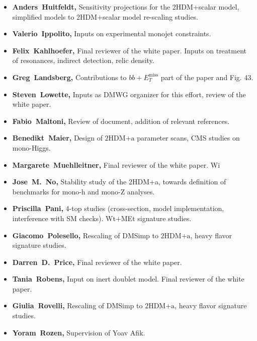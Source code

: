 \documentclass[a4paper, 11pt,notoc]{article}
\newcommand{\MET}{\ensuremath{E_T^\mathrm{miss}}\xspace}
\newcommand{\hdma}{\ensuremath{\textrm{2HDM+a}}\xspace}
\begin{document}
\begin{itemize}
\item \textbf{Anders~Huitfeldt,} Sensitivity projections for the 2HDM+scalar model, simplified models to 2HDM+scalar model re-scaling studies. 

\item \textbf{Valerio~Ippolito,} Inputs on experimental monojet constraints. 

\item \textbf{Felix~Kahlhoefer,} Final reviewer of the white paper. Inputs on treatment of resonances, indirect detection, relic density. 

\item \textbf{Greg~Landsberg,} Contributions to $bb+\MET$ part of the paper and Fig. 43.

\item \textbf{Steven~Lowette,} Inputs as DMWG organizer for this effort, review of the white paper. 

\item \textbf{Fabio~Maltoni,} Review of document, addition of relevant references.

\item \textbf{Benedikt~Maier,} Design of \hdma parameter scans, CMS studies on mono-Higgs.

\item \textbf{Margarete~Muehlleitner,} Final reviewer of the white paper. Wi

\item \textbf{Jose~M.~No,} Stability study of the 2HDM+a, towards definition of benchmarks for mono-h and mono-Z analyses.

\item \textbf{Priscilla~Pani,} 4-top studies (cross-section, model implementation, interference with SM checks). Wt+MEt signature studies. 

\item \textbf{Giacomo~Polesello,} Rescaling of DMSimp to \hdma, heavy flavor signature studies. 

\item \textbf{Darren~D.~Price,}  Final reviewer of the white paper. 

\item \textbf{Tania~Robens,} Input on inert doublet model. Final reviewer of the white paper. 

\item \textbf{Giulia~Rovelli,} Rescaling of DMSimp to \hdma, heavy flavor signature studies. 

\item \textbf{Yoram~Rozen,} Supervision of Yoav Afik. 


\end{itemize}
\end{document}

